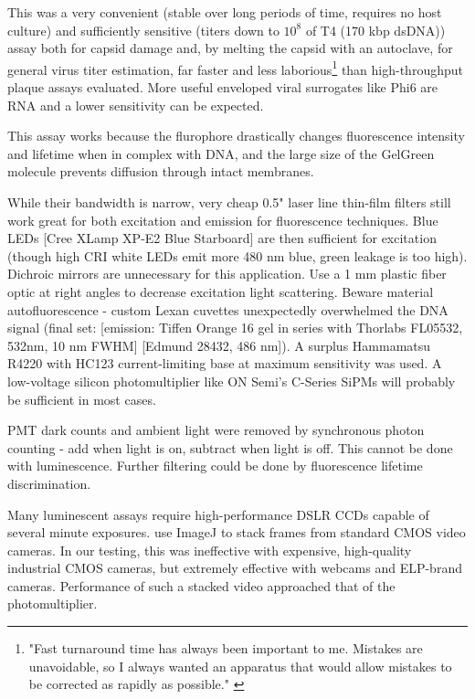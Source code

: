 \documentclass[paper.tex]{subfiles}
\begin{document}
\begin{multicols}{1}
This was a very convenient (stable over long periods of time, requires no host culture) and sufficiently sensitive (titers down to $10^8$ of T4 (170 kbp dsDNA)) assay both for capsid damage and, by melting the capsid with an autoclave, for general virus titer estimation, far faster and less laborious\footnote{"Fast turnaround time has always been important to me. Mistakes are unavoidable, so I always wanted an apparatus that would allow mistakes to be corrected as rapidly as possible." \cite{manipulation1998}} than high-throughput plaque assays evaluated\cite{Simple2018}\cite{Streamlining2018}. More useful enveloped viral surrogates like Phi6 are RNA and a lower sensitivity can be expected.\cite{Selected} 

This assay works because the flurophore drastically changes fluorescence intensity and lifetime when in complex with DNA\cite{SYBR2012}\cite{Characterization2010}, and the large size of the GelGreen molecule prevents diffusion through intact membranes.

While their bandwidth is narrow, very cheap 0.5" laser line thin-film filters still work great for both excitation and emission for fluorescence techniques. Blue LEDs [Cree XLamp XP-E2 Blue Starboard] are then sufficient for excitation (though high CRI white LEDs emit more 480 nm blue, green leakage is too high). Dichroic mirrors are unnecessary for this application. Use a 1 mm plastic fiber optic at right angles to decrease excitation light scattering. Beware material autofluorescence - custom Lexan cuvettes unexpectedly overwhelmed the DNA signal (final set: [emission: Tiffen Orange 16 gel\cite{lide2004crc} in series with Thorlabs FL05532, 532nm, 10 nm FWHM] [Edmund 28432, 486 nm]). A surplus Hammamatsu R4220 with HC123 current-limiting base at maximum sensitivity was used. A low-voltage silicon photomultiplier like ON Semi's C-Series SiPMs will probably be sufficient in most cases.

PMT dark counts and ambient light were removed by synchronous photon counting - add when light is on, subtract when light is off.  This cannot be done with luminescence. Further filtering could be done by fluorescence lifetime discrimination. 

Many luminescent assays require high-performance DSLR CCDs capable of several minute exposures. \cite{Image2012} use ImageJ\cite{NIH2012} to stack frames from standard CMOS video cameras. In our testing, this was ineffective with expensive, high-quality industrial CMOS cameras, but extremely effective with webcams and ELP-brand cameras. Performance of such a stacked video approached that of the photomultiplier. 


\end{multicols}
\end{document}
